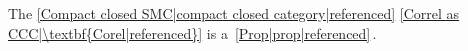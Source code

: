 
The \ref{Compact closed SMC|compact closed category|referenced} \ref{Correl as CCC|\textbf{Corel|referenced}} is a \,\ref{Prop|prop|referenced}\,.
